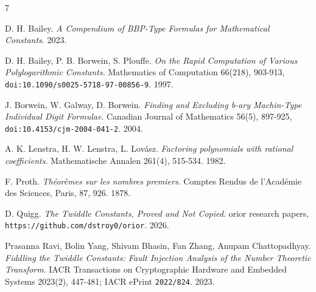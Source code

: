 \backmatter
{}
\begin{thebibliography}{7}

D. H. Bailey. \emph{A Compendium of BBP-Type Formulas for Mathematical Constants}. 2023.

D. H. Bailey, P. B. Borwein, S. Plouffe. \emph{On the Rapid Computation of Various Polylogarithmic Constants}. Mathematics of Computation 66(218), 903-913, \texttt{doi:10.1090/\allowbreak{}s0025-5718-97-00856-9}. 1997.

J. Borwein, W. Galway, D. Borwein. \emph{Finding and Excluding b-ary Machin-Type Individual Digit Formulae}. Canadian Journal of Mathematics 56(5), 897-925, \texttt{doi:10.4153/\allowbreak{}cjm-2004-041-2}. 2004.

A. K. Lenstra, H. W. Lenstra, L. Lov\'asz. \emph{Factoring polynomials with rational coefficients}. Mathematische Annalen 261(4), 515-534. 1982.

F. Proth. \emph{Th\'eor\`emes sur les nombres premiers}. Comptes Rendus de l'Acad\'emie des Sciences, Paris, 87, 926. 1878.

D. Quigg. \emph{The Twiddle Constants, Proved and Not Copied}. orior research papers, \texttt{https:/\allowbreak{}/\allowbreak{}github.com/\allowbreak{}dstroy0/\allowbreak{}orior}. 2026.

Prasanna Ravi, Bolin Yang, Shivam Bhasin, Fan Zhang, Anupam Chattopadhyay. \emph{Fiddling the Twiddle Constants: Fault Injection Analysis of the Number Theoretic Transform}. IACR Transactions on Cryptographic Hardware and Embedded Systems 2023(2), 447-481; IACR ePrint \texttt{2022/\allowbreak{}824}. 2023.

\end{thebibliography}
